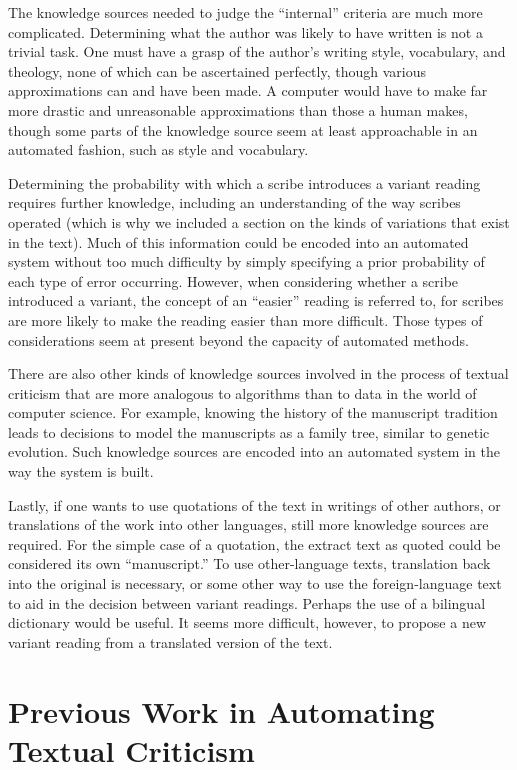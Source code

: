 \documentclass[onecolumn, 12pt]{article}
\begin{document}
The knowledge sources needed to judge the ``internal'' criteria are much more
complicated.  Determining what the author was likely to have written is not a
trivial task.  One must have a grasp of the author's writing style, vocabulary,
and theology, none of which can be ascertained perfectly, though various
approximations can and have been made.  A computer would have to make far more
drastic and unreasonable approximations than those a human makes, though some
parts of the knowledge source seem at least approachable in an automated
fashion, such as style and vocabulary.

Determining the probability with which a scribe introduces a variant reading
requires further knowledge, including an understanding of the way scribes
operated (which is why we included a section on the kinds of variations that
exist in the text).  Much of this information could be encoded into an
automated system without too much difficulty by simply specifying a prior
probability of each type of error occurring.  However, when considering whether
a scribe introduced a variant, the concept of an ``easier'' reading is referred
to, for scribes are more likely to make the reading easier than more difficult.
Those types of considerations seem at present beyond the capacity of automated
methods.

There are also other kinds of knowledge sources involved in the process of
textual criticism that are more analogous to algorithms than to data in the
world of computer science.  For example, knowing the history of the manuscript
tradition leads to decisions to model the manuscripts as a family tree, similar
to genetic evolution.  Such knowledge sources are encoded into an automated
system in the way the system is built.

Lastly, if one wants to use quotations of the text in writings of other
authors, or translations of the work into other languages, still more knowledge
sources are required.  For the simple case of a quotation, the extract text as
quoted could be considered its own ``manuscript.''  To use other-language
texts, translation back into the original is necessary, or some other way to
use the foreign-language text to aid in the decision between variant readings.
Perhaps the use of a bilingual dictionary would be useful.  It seems more
difficult, however, to propose a new variant reading from a translated version
of the text.

\section{Previous Work in Automating Textual Criticism}
\label{sec:previous-work}
\end{document}
